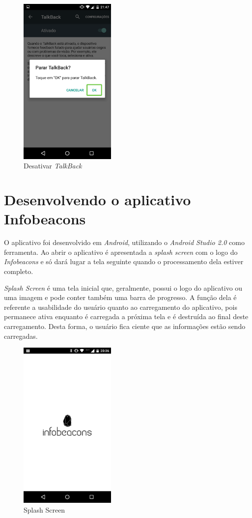 \begin{figure}[H]
  \centering
  \includegraphics[width=4.7cm]{./figs/desativar_talkback.png}
  \caption{Desativar \textit{TalkBack}}
  \par{}  
\end{figure}

\section{Desenvolvendo o aplicativo Infobeacons}
O aplicativo foi desenvolvido em \textit{Android}, utilizando o \textit{Android Studio 2.0} como ferramenta. Ao abrir o aplicativo é apresentada a \textit{splash screen} com o logo do \textit{Infobeacons} e só dará lugar a tela seguinte quando o processamento dela estiver completo. 

\textit{Splash Screen} é uma tela inicial que, geralmente, possui o logo do aplicativo ou uma imagem e pode conter também uma barra de progresso. A função dela é referente a usabilidade do usuário quanto ao carregamento do aplicativo, pois permanece ativa enquanto é carregada a próxima tela e é destruída ao final deste carregamento. Desta forma, o usuário fica ciente que as informações estão sendo carregadas.

\begin{figure}[H]
  \centering
  \includegraphics[width=4.7cm]{./figs/app1.png}
  \caption{Splash Screen}
  \par{}
\end{figure}

